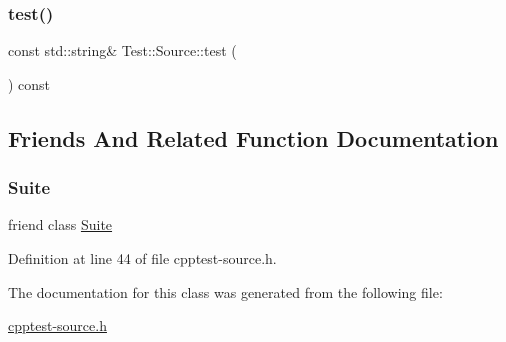 \mbox{\label{class_test_1_1_source_a7f4861f56448910101a61d4e3c1c471f}} 
\subsubsection{\texorpdfstring{test()}{test()}}
{\footnotesize\ttfamily const std\+::string\& Test\+::\+Source\+::test (\begin{DoxyParamCaption}{ }\end{DoxyParamCaption}) const}



\subsection{Friends And Related Function Documentation}
\mbox{\label{class_test_1_1_source_a7de7b0dd89982bdae285f3a3b6197f9c}} 
\subsubsection{\texorpdfstring{Suite}{Suite}}
{\footnotesize\ttfamily friend class \mbox{\hyperlink{class_test_1_1_suite}{Suite}}\hspace{0.3cm}{\ttfamily [friend]}}



Definition at line 44 of file cpptest-\/source.\+h.



The documentation for this class was generated from the following file\+:\begin{DoxyCompactItemize}
\item 
\mbox{\hyperlink{cpptest-source_8h}{cpptest-\/source.\+h}}\end{DoxyCompactItemize}
